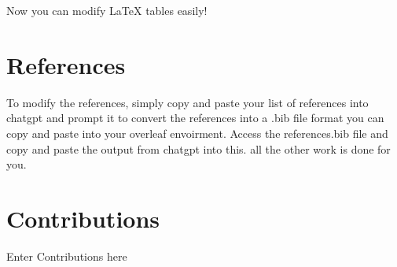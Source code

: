\documentclass[a4paper,num-refs]{oup-contemporary}
\begin{document}
Now you can modify LaTeX tables easily! 


\newpage



\section{References}

To modify the references, simply copy and paste your list of references into chatgpt and prompt it to convert the references into a .bib file format you can copy and paste into your overleaf envoirment. Access the references.bib file and copy and paste the output from chatgpt into this. all the other work is done for you. 

\section{Contributions}

Enter Contributions here

\newpage

\appendix


\newpage

\nocite{*}
\printbibliography
\end{document}
